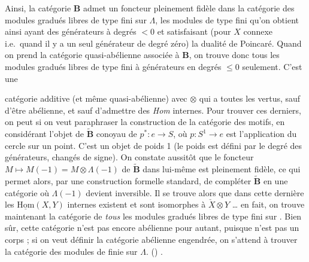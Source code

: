 \documentclass[11pt,a4paper]{article}
\begin{document}
Ainsi, la catégorie $\mathbf{B}$ admet un foncteur pleinement fidèle dans la
catégorie des modules gradués libres de type fini sur $\Lambda$, les modules de
type fini qu'on obtient ainsi ayant des générateurs à degrés $< 0$ et
satisfaisant (pour $X$ connexe i.e.\ quand il y a un seul générateur de degré
zéro) la dualité de Poincaré. Quand on prend la catégorie quasi-abélienne
 associée à $\mathbf{B}$, on trouve donc tous les
modules gradués libres de type fini à générateurs en degrés $\leq 0$ seulement.
C'est une


catégorie additive (et même quasi-abélienne) avec $\otimes$ qui a toutes les
vertus, sauf d'être abélienne, et sauf d'admettre des \emph{Hom} internes. Pour
trouver ces derniers, on peut si on veut paraphraser la construction de la
catégorie des motifs, en considérant l'objet  de
$\widetilde{\mathbf{B}}$ conoyau de $p^{*} : e \to S$, où $p : S^{1} \to e$ est
l'application du cercle sur un point. C'est un objet de poids 1 (le poids est
défini par le degré des générateurs, changés de signe). On constate aussitôt que
le foncteur $M \mapsto M(-1) = M \otimes \Lambda(-1)$ de
$\widetilde{\mathbf{B}}$ dans lui-même est pleinement fidèle, ce qui permet
alors, par une construction formelle standard, de compléter
$\widetilde{\mathbf{B}}$ en une catégorie où $\Lambda(-1)$ devient inversible.
Il se trouve alors que dans cette dernière les $\underline{\mathrm{Hom}}(X, Y)$
internes existent et sont isomorphes à $\check{X} \otimes Y$ … en fait, on
trouve maintenant la catégorie de \emph{tous} les modules gradués libres de type
fini sur \supplied{$\Lambda$}. Bien sûr, cette catégorie n'est pas encore abélienne
pour autant, puisque \supplied{$\Lambda$} n'est pas un corps ; si on veut définir la
catégorie abélienne engendrée, on s'attend à trouver la catégorie des modules
de   finie sur $\Lambda$. () .
\end{document}
